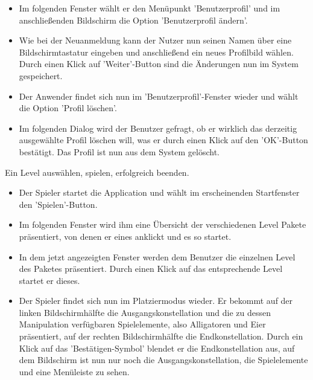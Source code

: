 \begin{requirements}
\begin{itemize}
  			\item Im folgenden Fenster wählt er den Menüpunkt 'Benutzerprofil' und im anschließenden Bildschirm die Option 'Benutzerprofil ändern'.
  			
  			\item Wie bei der Neuanmeldung kann der Nutzer nun seinen Namen über eine Bildschirmtastatur eingeben und anschließend ein neues Profilbild wählen. Durch einen Klick auf 'Weiter'-Button sind die Änderungen nun im System gespeichert. 
  			
  			\item Der Anwender findet sich nun im 'Benutzerprofil'-Fenster wieder und wählt die Option 'Profil löschen'.
  			
  			\item Im folgenden Dialog wird der Benutzer gefragt, ob er wirklich das derzeitig ausgewählte Profil löschen will, was er durch einen Klick auf den 'OK'-Button bestätigt. Das Profil ist nun aus dem System gelöscht.

  			
	\end{itemize}

  	
  	 Ein Level auswählen, spielen, erfolgreich beenden.
  	
  	\begin{itemize}
  	
  			\item Der Spieler startet die Application und wählt im erscheinenden Startfenster den 'Spielen'-Button.
  			
  			\item Im folgenden Fenster wird ihm eine Übersicht der verschiedenen Level Pakete präsentiert, von denen er eines anklickt und es so startet.
  			
  			\item In dem jetzt angezeigten Fenster werden dem Benutzer die einzelnen Level des Paketes präsentiert. Durch einen Klick auf das entsprechende Level startet er dieses.
  			
  			\item Der Spieler findet sich nun im Platziermodus wieder. Er bekommt auf der linken Bildschirmhälfte die Ausgangskonstellation und die zu dessen Manipulation verfügbaren Spielelemente, also Alligatoren und Eier präsentiert, auf der rechten Bildschirmhälfte die Endkonstellation. Durch ein Klick auf das 'Bestätigen-Symbol' blendet er die Endkonstellation aus, auf dem Bildschirm ist nun nur noch die Ausgangskonstellation, die Spielelemente und eine Menüleiste zu sehen. 
  			

\end{itemize}
\end{requirements}

